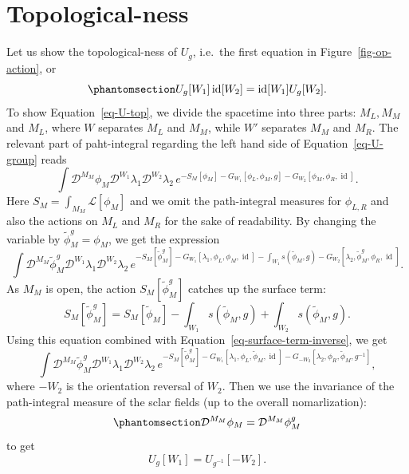 \documentclass[
  letterpaper,
  DIV=11,
  numbers=noendperiod]{scrreport}
\DeclareMathOperator{\id}{id}
\begin{document}
\section{Topological-ness}\label{topological-ness}

Let us show the topological-ness of \(U_g\), i.e.~the first equation in
Figure~\ref{fig-op-action}, or
\begin{equation}\phantomsection\label{eq-U-top}{
U_{g}[W_1]\id[W_2] = \id[W_1]U_{g}[W_2].
}\end{equation} To show Equation~\ref{eq-U-top}, we divide the spacetime
into three parts: \(M_L,M_M\) and \(M_L\), where \(W\) separates \(M_L\)
and \(M_M\), while \(W'\) separates \(M_M\) and \(M_R\). The relevant
part of paht-integral regarding the left hand side of
Equation~\ref{eq-U-group} reads \[
\int\mathcal{D}^{M_M}\phi_M\mathcal{D}^{W_1}\lambda_1\mathcal{D}^{W_2}\lambda_2 \, e^{-S_M[\phi_M]-G_{W_1}[\phi_L,\phi_M,g]-G_{W_2}[\phi_M,\phi_R,\id]}.
\] Here \(S_M = \int_{M_M}\mathcal{L}[\phi_M]\) and we omit the
path-integral measures for \(\phi_{L,R}\) and also the actions on
\(M_L\) and \(M_R\) for the sake of readability. By changing the
variable by \(\tilde{\phi}_M^{g} = \phi_M\), we get the expression \[
\int\mathcal{D}^{M_M}\tilde{\phi}_M^g\mathcal{D}^{W_1}\lambda_1\mathcal{D}^{W_2}\lambda_2 \, e^{-S_M[\tilde\phi_M^g]-G_{W_1}[\lambda_1,\phi_L,\phi_M,\id] - \int_{W_1} s(\tilde\phi_M,g) -G_{W_2}[\lambda_2,\tilde\phi_M^g,\phi_R,\id]}.
\] As \(M_M\) is open, the action \(S_M[\tilde\phi_M^g]\) catches up the
surface term: \[
S_M[\tilde\phi_M^g] = S_M[\tilde\phi_M] - \int_{W_1} s(\tilde{\phi}_M,g) + \int_{W_2} s(\tilde{\phi}_M,g).
\] Using this equation combined with
Equation~\ref{eq-surface-term-inverse}, we get \[
\int\mathcal{D}^{M_M}\tilde{\phi}_M^g\mathcal{D}^{W_1}\lambda_1\mathcal{D}^{W_2}\lambda_2 \, e^{-S_M[\tilde\phi_M^g]-G_{W_1}[\lambda_1,\phi_L,\tilde\phi_M,\id] -G_{-W_2}[\lambda_2,\phi_R,\tilde\phi_M,g^{-1}]},
\] where \(-W_2\) is the orientation reversal of \(W_2\). Then we use
the invariance of the path-integral measure of the sclar fields (up to
the overall nomarlization):
\begin{equation}\phantomsection\label{eq-measure-inv}{\mathcal{D}^{M_M}\phi_M = \mathcal{D}^{M_M}\phi_M^g
}\end{equation} to get \[
U_{g}[W_1]= U_{g^{-1}}[-W_2].
\]
\end{document}
